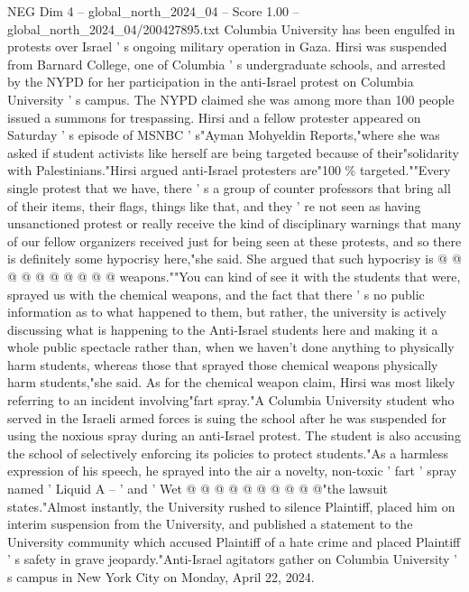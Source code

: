 \begin{textsample}{NEG Dim 4 – global\_north\_2024\_04 – Score 1.00 – global\_north\_2024\_04/200427895.txt}  \label{ex:f4_neg_097}
Columbia University has been engulfed in protests over Israel ' s ongoing military operation in Gaza.
Hirsi was suspended from Barnard College, one of Columbia ' s undergraduate schools, and arrested by the NYPD for her participation in the anti-Israel protest on Columbia University ' s campus.
The NYPD claimed she was among more than 100 people issued a summons for trespassing.
Hirsi and a fellow protester appeared on Saturday ' s episode of MSNBC ' s"Ayman Mohyeldin Reports,"where she was asked if student activists like herself are being targeted because of their"solidarity with Palestinians."Hirsi argued anti-Israel protesters are"100 \% targeted.""Every single protest that we have, there ' s a group of counter professors that bring all of their items, their flags, things like that, and they ' re not seen as having unsanctioned protest or really receive the kind of disciplinary warnings that many of our fellow organizers received just for being seen at these protests, and so there is definitely some hypocrisy here,"she said.
She argued that such hypocrisy is @ @ @ @ @ @ @ @ @ @ weapons.""You can kind of see it with the students that were, sprayed us with the chemical weapons, and the fact that there ' s no public information as to what happened to them, but rather, the university is actively discussing what is happening to the Anti-Israel students here and making it a whole public spectacle rather than, when we haven't done anything to physically harm students, whereas those that sprayed those chemical weapons physically harm students,"she said.
As for the chemical weapon claim, Hirsi was most likely referring to an incident involving"fart spray."A Columbia University student who served in the Israeli armed forces is suing the school after he was suspended for using the noxious spray during an anti-Israel protest.
The student is also accusing the school of selectively enforcing its policies to protect students."As a harmless expression of his speech, he sprayed into the air a novelty, non-toxic ' fart ' spray named ' Liquid A -- ' and ' Wet @ @ @ @ @ @ @ @ @ @"the lawsuit states."Almost instantly, the University rushed to silence Plaintiff, placed him on interim suspension from the University, and published a statement to the University community which accused Plaintiff of a hate crime and placed Plaintiff ' s safety in grave jeopardy."Anti-Israel agitators gather on Columbia University ' s campus in New York City on Monday, April 22, 2024.

\end{textsample}
